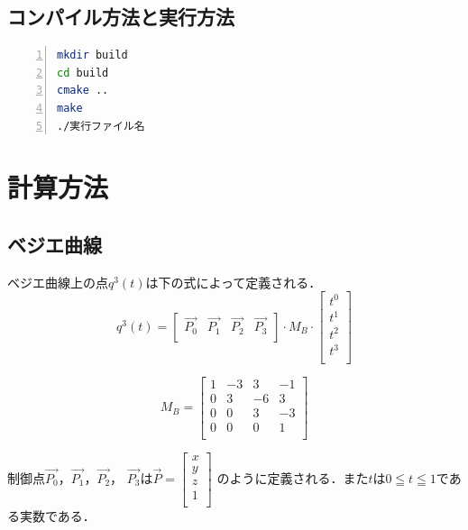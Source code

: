 \documentclass[a4paper,10pt]{jsarticle}
\begin{document}
\subsection{コンパイル方法と実行方法}

\begin{lstlisting}[basicstyle=\ttfamily\footnotesize, language=Bash, frame=single, firstnumber=1, numbers=left, breaklines=true]
mkdir build
cd build
cmake ..
make
./実行ファイル名
\end{lstlisting}

\section{計算方法}
\subsection{ベジエ曲線}
ベジエ曲線上の点$q^3(t)$は下の式によって定義される．
\begin{equation}
\label{eq:a}
  q^3(t) = \left[
    \begin{array}{cccc}
      \vec{P_0} & \vec{P_1} & \vec{P_2} & \vec{P_3} \\
    \end{array}
  \right]\cdot M_B \cdot
  \left[
    \begin{array}{c}
      t^0\\
      t^1\\
      t^2\\
      t^3\\
    \end{array}
  \right]
\end{equation}

\begin{equation}
\label{eq:b}
  M_B =
  \left[
    \begin{array}{cccc}
      1 & -3 & 3 & -1 \\
      0 & 3 & -6 & 3\\
      0 & 0 & 3 & -3\\
      0 & 0 & 0 & 1\\
    \end{array}
  \right]
\end{equation}

制御点$\vec{P_0}$，$\vec{P_1}$，$\vec{P_2}$， $\vec{P_3}$は$\vec{P}=\left[
    \begin{array}{c}
      x\\
      y\\
      z\\
      1\\
    \end{array}
  \right]$
のように定義される．また$t$は$0\leqq t \leqq 1$である実数である．
\end{document}
